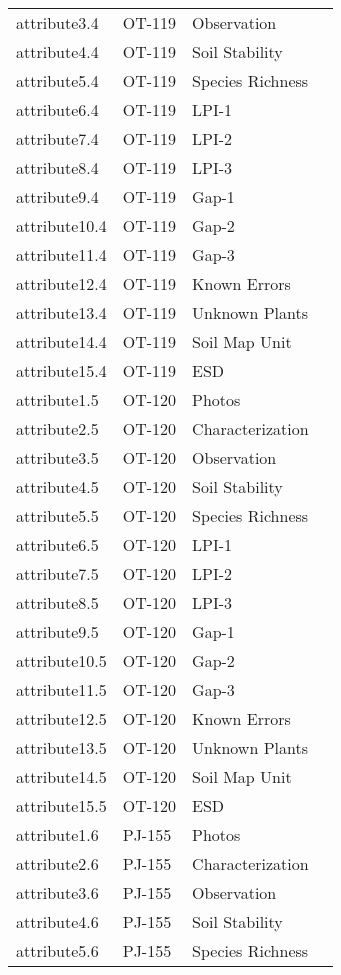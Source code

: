\documentclass[
]{article}
\begin{document}
\begin{longtable}[]{@{}llll@{}}
attribute3.4 & OT-119 & Observation & \\
attribute4.4 & OT-119 & Soil Stability & \\
attribute5.4 & OT-119 & Species Richness & \\
attribute6.4 & OT-119 & LPI-1 & \\
attribute7.4 & OT-119 & LPI-2 & \\
attribute8.4 & OT-119 & LPI-3 & \\
attribute9.4 & OT-119 & Gap-1 & \\
attribute10.4 & OT-119 & Gap-2 & \\
attribute11.4 & OT-119 & Gap-3 & \\
attribute12.4 & OT-119 & Known Errors & \\
attribute13.4 & OT-119 & Unknown Plants & \\
attribute14.4 & OT-119 & Soil Map Unit & \\
attribute15.4 & OT-119 & ESD & \\
attribute1.5 & OT-120 & Photos & \\
attribute2.5 & OT-120 & Characterization & \\
attribute3.5 & OT-120 & Observation & \\
attribute4.5 & OT-120 & Soil Stability & \\
attribute5.5 & OT-120 & Species Richness & \\
attribute6.5 & OT-120 & LPI-1 & \\
attribute7.5 & OT-120 & LPI-2 & \\
attribute8.5 & OT-120 & LPI-3 & \\
attribute9.5 & OT-120 & Gap-1 & \\
attribute10.5 & OT-120 & Gap-2 & \\
attribute11.5 & OT-120 & Gap-3 & \\
attribute12.5 & OT-120 & Known Errors & \\
attribute13.5 & OT-120 & Unknown Plants & \\
attribute14.5 & OT-120 & Soil Map Unit & \\
attribute15.5 & OT-120 & ESD & \\
attribute1.6 & PJ-155 & Photos & \\
attribute2.6 & PJ-155 & Characterization & \\
attribute3.6 & PJ-155 & Observation & \\
attribute4.6 & PJ-155 & Soil Stability & \\
attribute5.6 & PJ-155 & Species Richness & \\

\end{longtable}
\end{document}
